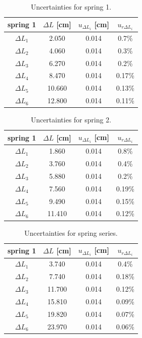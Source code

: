 \documentclass[a4paper,12pt]{article}
\begin{document}
\begin{table}[h]
\begin{center}
\begin{tabular}{|c|c|c|c|}
\hline
spring 1 &$ \Delta L $ [cm]  & $ u_{\Delta L_i} $ [cm] & $ u_{r\Delta L_i} $\\
\hline
$\Delta L_1$ & 2.050 & 0.014 & 0.7\% \\
$\Delta L_2$ & 4.060 & 0.014 & 0.3\% \\
$\Delta L_3$ & 6.270 & 0.014 & 0.2\% \\
$\Delta L_4$ & 8.470 & 0.014 & 0.17\% \\
$\Delta L_5$ & 10.660 & 0.014 & 0.13\%\\
$\Delta L_6$ & 12.800 & 0.014 & 0.11\% \\
\hline
\end{tabular}
\end{center}
\caption{Uncertainties for spring 1.}
\end{table}

\begin{table}[h]
\begin{center}
\begin{tabular}{|c|c|c|c|}
\hline
spring 1 &$ \Delta L $ [cm]  & $ u_{\Delta L_i} $ [cm] & $ u_{r\Delta L_i} $\\
\hline
$\Delta L_1$ & 1.860 & 0.014 & 0.8\% \\
$\Delta L_2$ & 3.760 & 0.014 & 0.4\% \\
$\Delta L_3$ & 5.880 & 0.014 & 0.2\% \\
$\Delta L_4$ & 7.560 & 0.014 & 0.19\% \\
$\Delta L_5$ & 9.490 & 0.014 & 0.15\%\\
$\Delta L_6$ & 11.410 & 0.014 & 0.12\% \\
\hline
\end{tabular}
\end{center}
\caption{Uncertainties for spring 2.}
\end{table}

\begin{table}[p]
\begin{center}
\begin{tabular}{|c|c|c|c|}
\hline
spring 1 &$ \Delta L $ [cm]  & $ u_{\Delta L_i} $ [cm] & $ u_{r\Delta L_i} $\\
\hline
$\Delta L_1$ & 3.740 & 0.014 & 0.4\% \\
$\Delta L_2$ & 7.740 & 0.014 & 0.18\% \\
$\Delta L_3$ & 11.700 & 0.014 & 0.12\% \\
$\Delta L_4$ & 15.810 & 0.014 & 0.09\% \\
$\Delta L_5$ & 19.820 & 0.014 & 0.07\%\\
$\Delta L_6$ & 23.970 & 0.014 & 0.06\% \\
\hline
\end{tabular}
\end{center}
\caption{Uncertainties for spring series.}
\end{table}
\end{document}
